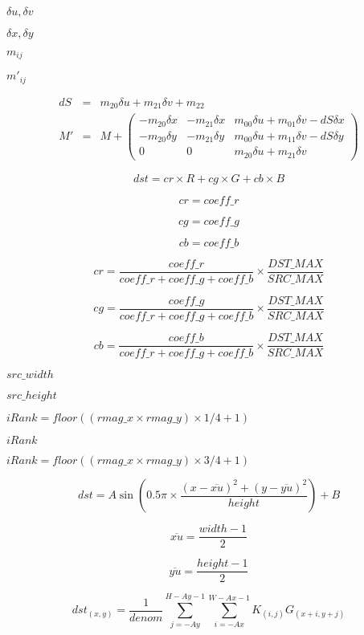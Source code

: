 \documentclass{article}
\begin{document}
{$\delta u, \delta v$
\pagebreak

$\delta x, \delta y$
\pagebreak

$m_{ij}$
\pagebreak

$m'_{ij}$
\pagebreak

\begin{eqnarray*} dS & = & m_{20} \delta u + m_{21} \delta v + m_{22} \\ M' & = & M + \left(\begin{array}{ccc} -m_{20}\delta x & -m_{21}\delta x & m_{00} \delta u + m_{01} \delta v - dS \delta x \\ -m_{20}\delta y & -m_{21}\delta y & m_{00} \delta u + m_{11} \delta v - dS \delta y \\ 0 & 0 & m_{20} \delta u + m_{21} \delta v \end{array}\right) \end{eqnarray*}
\pagebreak

\[ dst = cr \times R + cg \times G + cb \times B \]
\pagebreak

\[ cr = coeff\_r \]
\pagebreak

\[ cg = coeff\_g \]
\pagebreak

\[ cb = coeff\_b \]
\pagebreak

\[ cr = \frac{coeff\_r}{coeff\_r + coeff\_g + coeff\_b} \times \frac{DST\_MAX}{SRC\_MAX} \]
\pagebreak

\[ cg = \frac{coeff\_g}{coeff\_r + coeff\_g + coeff\_b} \times \frac{DST\_MAX}{SRC\_MAX} \]
\pagebreak

\[ cb = \frac{coeff\_b}{coeff\_r + coeff\_g + coeff\_b} \times \frac{DST\_MAX}{SRC\_MAX} \]
\pagebreak

$ src\_width $
\pagebreak

$ src\_height $
\pagebreak

$iRank = floor ( ( rmag\_x \times rmag\_y ) \times 1/4 + 1 )$
\pagebreak

$iRank$
\pagebreak

$iRank = floor ( ( rmag\_x \times rmag\_y ) \times 3/4 + 1 )$
\pagebreak

\[ dst = A \sin( 0.5 \pi \times \frac{ (x-\overline{xu})^{2} + (y-\overline{yu})^{2} }{height} ) + B \]
\pagebreak

\[ \overline{xu} = \frac{width-1}{2} \]
\pagebreak

\[ \overline{yu} = \frac{height-1}{2} \]
\pagebreak

\[ dst_{(x,y)} = \frac{1}{denom}\sum^{H-Ay-1}_{j=-Ay}\sum^{W-Ax-1}_{i=-Ax}K_{(i,j)}G_{(x+i,y+j)} \]
\pagebreak

}
\end{document}
